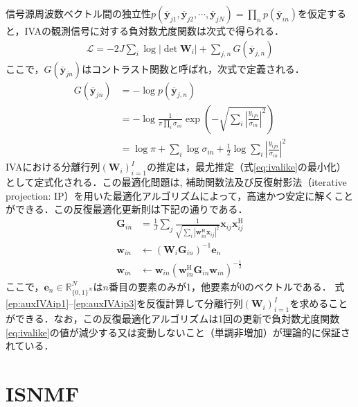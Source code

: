 信号源周波数ベクトル間の独立性$p(\overline{\bm{y}}_{j1}, \overline{\bm{y}}_{j2}, \cdots, \overline{\bm{y}}_{jN}) = \prod_n p(\overline{\bm{y}}_{in})$を仮定すると，IVAの観測信号に対する負対数尤度関数は次式で得られる．
\begin{align}
    \mathcal{L} = -2J \sum_i \log |\det \bm{W}_i| + \sum_{j,n} G(\overline{\bm{y}}_{j,n})
    \label{eq:ivalike}
\end{align}
ここで，$G(\overline{\bm{y}}_{jn})$はコントラスト関数と呼ばれ，次式で定義される．
\begin{align}
  \nonumber G(\overline{\bm{y}}_{jn}) &= -\log p(\overline{\bm{y}}_{j,n}) \\
  \nonumber  &= -\log \frac{1}{\pi \prod_{i} \sigma_{in}} \exp \left(  - \sqrt{ \sum_i \left| \frac{y_{ijn}}{\sigma_{in}} \right|^2}  \right) \\
  &= \log \pi + \sum_i \log \sigma_{in} + \frac{1}{2} \log \sum_i \left| \frac{y_{ijn}}{\sigma_{in}}\right|^2
\end{align}
IVAにおける分離行列$( \bm{W}_i )_{i=1}^I$の推定は，最尤推定（式\eqref{eq:ivalike}の最小化）として定式化される．この最適化問題は, 補助関数法\cite{auxfunc}{及び反復射影法（iterative projection: IP）\cite{auxIVA}を用いた最適化アルゴリズムによって，高速かつ安定に解くことができる\cite{stable_auxIVA}．この反復最適化更新則は下記の通りである．}
\begin{align}
\bm{G}_{in} &= \frac{1}{J} \sum_j \frac{1}{\sqrt{\sum_{i} |\bm{w}_{in}^\mathrm{H}\bm{x}_{ij}|^{2}}} \bm{x}_{ij} \bm{x}_{ij}^{\mathrm{H}} \label{ep:auxIVAip1} \\
\bm{w}_{in} &\leftarrow (\bm{W}_i \bm{G}_{in})^{-1} \bm{e}_n \label{ep:auxIVAip2} \\
\bm{w}_{in} &\leftarrow \bm{w}_{in} ( \bm{w}_{in}^{\mathrm{H}} \bm{G}_{in} \bm{w}_{in} )^{-\frac{1}{2}} \label{ep:auxIVAip3}
\end{align}
ここで，$\bm{e}_{n} \in \mathbb{R}^{N}_{\{ 0, 1 \}^N}$は$n$番目の要素のみが1，他要素が0のベクトルである．
{式\eqref{ep:auxIVAip1}--\eqref{ep:auxIVAip3}を反復計算して分離行列$( \bm{W}_i )_{i=1}^I$を求めることができる．なお，この反復最適化アルゴリズムは1回の更新で負対数尤度関数\eqref{eq:ivalike}の値が減少する又は変動しないこと（単調非増加）が理論的に保証されている．}


\section{ISNMF}
\label{sec:conv:isnmf}

